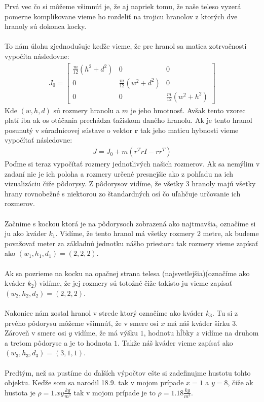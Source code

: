 \documentclass[a4paper]{article}
\begin{document}
	Prvá vec čo si môžeme všimnúť je, že aj napriek tomu, že naše teleso vyzerá pomerne komplikovane vieme ho rozdeliť na trojicu hranolov z ktorých dve hranoly sú dokonca kocky.
	\\
	\\
	To nám úlohu zjednodušuje keďže vieme, že pre hranol sa matica zotrvačnosti vypočíta následovne:
	\begin{align*}
		J_0 = \begin{bmatrix}
			\frac{m}{12}(h^2 + d^2) & 0 & 0 \\
			0 & \frac{m}{12}(w^2 + d^2) & 0 \\
			0 & 0 & \frac{m}{12}(w^2 + h^2)
		\end{bmatrix}
	\end{align*}
	Kde $(w, h, d)$ sú rozmery hranolu a $m$ je jeho hmotnosť. Avšak tento vzorec platí iba ak os otáčania prechádza ťažiskom daného hranolu. Ak je tento hranol posunutý v súradnicovej sústave o vektor $\boldsymbol{r}$ tak jeho maticu hybnosti vieme vypočítať následovne:
	\begin{align*}
		J = J_0 + m(r^TrI-rr^T)
	\end{align*}
	Poďme si teraz vypočítať rozmery jednotlivých našich rozmerov. Ak sa nemýlim v zadaní nie je ich poloha a rozmery určené presnejšie ako z pohľadu na ich vizualizáciu čiže pôdorysy. Z pôdorysov vidíme, že všetky 3 hranoly majú všetky hrany rovnobežné s niektorou zo štandardných osí čo uľahčuje určovanie ich rozmerov.
	\\
	\\
	Začnime s kockou ktorá je na pôdorysoch zobrazená ako najtmavšia, označíme si ju ako kváder $k_1$. Vidíme, že tento hranol má všetky rozmery 2 metre, ak budeme považovať meter za základnú jednotku nášho priestoru tak rozmery vieme zapísať ako $(w_1, h_1, d_1) = (2, 2, 2)$. 
	\\
	\\
	Ak sa pozrieme na kocku na opačnej strana telesa (najsvetlejšia)(označíme ako kváder $k_2$) vidíme, že jej rozmery sú totožné čiže takisto ju vieme zapísať $(w_2, h_2, d_2) = (2, 2, 2)$.
	\\
	\\
	Nakoniec nám zostal hranol v strede ktorý označíme ako kváder $k_3$. Tu si z prvého pôdorysu môžeme všimnúť, že v smere osi $x$ má náš kváder šírku $3$. Zároveň v smere osi $y$ vidíme, že má výšku $1$, hodnotu hĺbky $z$ vidíme na druhom a treťom pôdoryse a je to hodnota $1$. Takže náš kváder vieme zapísať ako $(w_3, h_3, d_3) = (3, 1, 1)$.
	\\
	\\
	Predtým, než sa pustíme do ďalších výpočtov ešte si zadefinujme hustotu tohto objektu. Keďže som sa narodil 18.9. tak v mojom prípade $x=1$ a $y=8$, čiže ak hustota je $\rho=1.xy\frac{kg}{m^3}$ tak v mojom prípade je to $\rho=1.18\frac{kg}{m^3}$.
	\\
	\newpage
\end{document}
